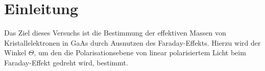 \section{Einleitung}
Das Ziel dieses Versuchs ist die Bestimmung der effektiven Massen von Kristallelektronen in GaAs durch Ausnutzen des Faraday-Effekts. Hierzu wird der Winkel $\Theta$, um den die Polarisationsebene von linear polarisiertem Licht beim Faraday-Effekt gedreht wird, bestimmt.
